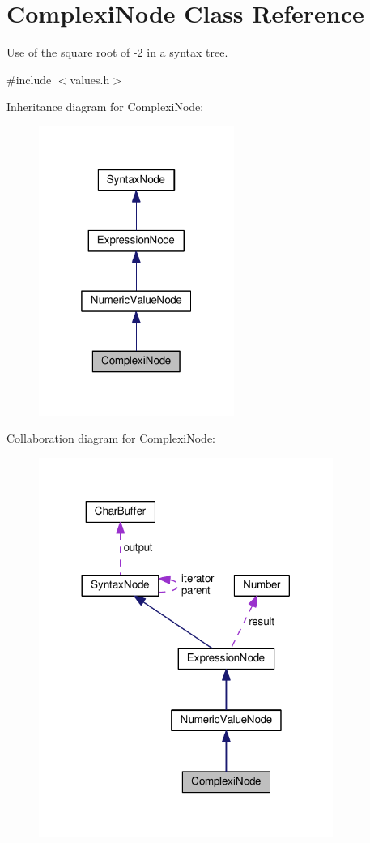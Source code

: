 \hypertarget{classComplexiNode}{}\section{Complexi\+Node Class Reference}
\label{classComplexiNode}


Use of the square root of -\/2 in a syntax tree.  




{\ttfamily \#include $<$values.\+h$>$}



Inheritance diagram for Complexi\+Node\+:
\nopagebreak
\begin{figure}[H]
\begin{center}
\leavevmode
\includegraphics[width=181pt]{dc/d54/classComplexiNode__inherit__graph}
\end{center}
\end{figure}


Collaboration diagram for Complexi\+Node\+:
\nopagebreak
\begin{figure}[H]
\begin{center}
\leavevmode
\includegraphics[width=272pt]{d2/d38/classComplexiNode__coll__graph}
\end{center}
\end{figure}
